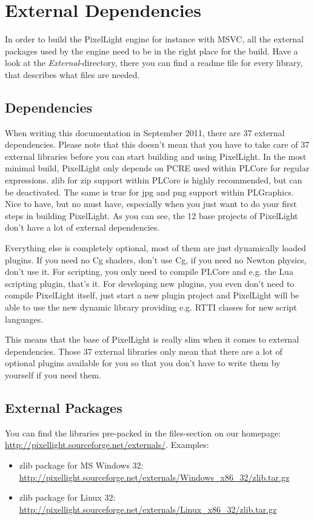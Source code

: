 \chapter{External Dependencies}
\label{Chapter:ExternalDependencies}
In order to build the PixelLight engine for instance with \ac{MSVC}, all the external packages used by the engine need to be in the right place for the build. Have a look at the \emph{External}-directory, there you can find a readme file for every library, that describes what files are needed.




\section{Dependencies}
When writing this documentation in September 2011, there are 37 external dependencies. Please note that this doesn't mean that you have to take care of 37 external libraries before you can start building and using PixelLight. In the most minimal build, PixelLight only depends on PCRE used within PLCore for regular expressions. zlib for zip support within PLCore is highly recommended, but can be deactivated. The same is true for jpg and png support within PLGraphics. Nice to have, but no must have, especially when you just want to do your first steps in building PixelLight. As you can see, the 12 base projects of PixelLight don't have a lot of external dependencies.

Everything else is completely optional, most of them are just dynamically loaded plugins. If you need no Cg shaders, don't use Cg, if you need no Newton physics, don't use it. For scripting, you only need to compile PLCore and e.g. the Lua scripting plugin, that's it. For developing new plugins, you even don't need to compile PixelLight itself, just start a new plugin project and PixelLight will be able to use the new dynamic library providing e.g. \ac{RTTI} classes for new script languages.

This means that the base of PixelLight is really slim when it comes to external dependencies. Those 37 external libraries only mean that there are a lot of optional plugins available for you so that you don't have to write them by yourself if you need them.




\section{External Packages}
You can find the libraries pre-packed in the files-section on our homepage: \url{http://pixellight.sourceforge.net/externals/}. Examples:
\begin{itemize}
\item{zlib package for MS Windows \SI{32}{\bit}: \url{http://pixellight.sourceforge.net/externals/Windows_x86_32/zlib.tar.gz}}
\item{zlib package for Linux \SI{32}{\bit}: \url{http://pixellight.sourceforge.net/externals/Linux_x86_32/zlib.tar.gz}}
\end{itemize}

